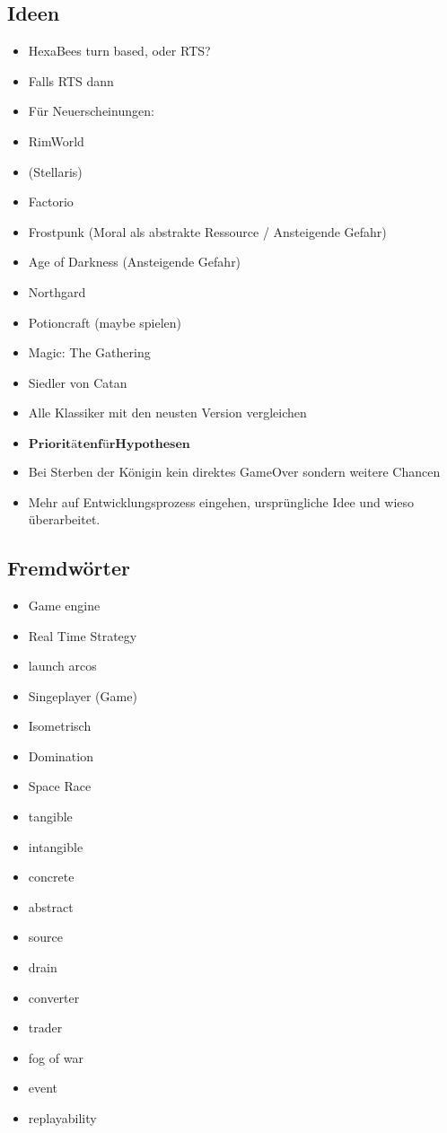 \subsection*{Ideen}
\begin{itemize}

    \item HexaBees turn based, oder RTS?
    \item Falls RTS dann 
    \item Für Neuerscheinungen:
    \item RimWorld
    \item (Stellaris)
    \item Factorio
    \item Frostpunk (Moral als abstrakte Ressource / Ansteigende Gefahr)
    \item Age of Darkness (Ansteigende Gefahr)
    \item Northgard
    \item Potioncraft (maybe spielen)
    \item Magic: The Gathering
    \item Siedler von Catan
    \item Alle Klassiker mit den neusten Version vergleichen
    \item $\mathbf{Prioritäten für Hypothesen}$
    \item Bei Sterben der Königin kein direktes GameOver sondern weitere Chancen
    \item Mehr auf Entwicklungsprozess eingehen, ursprüngliche Idee und wieso überarbeitet.
\end{itemize}

\subsection*{Fremdwörter}
\begin{itemize}
    \item Game engine
    \item Real Time Strategy
    \item launch arcos
    \item Singeplayer (Game)
    \item Isometrisch
    \item Domination
    \item Space Race
    \item tangible
    \item intangible
    \item concrete
    \item abstract
    \item source
    \item drain
    \item converter
    \item trader
    \item fog of war
    \item event
    \item replayability
\end{itemize}

